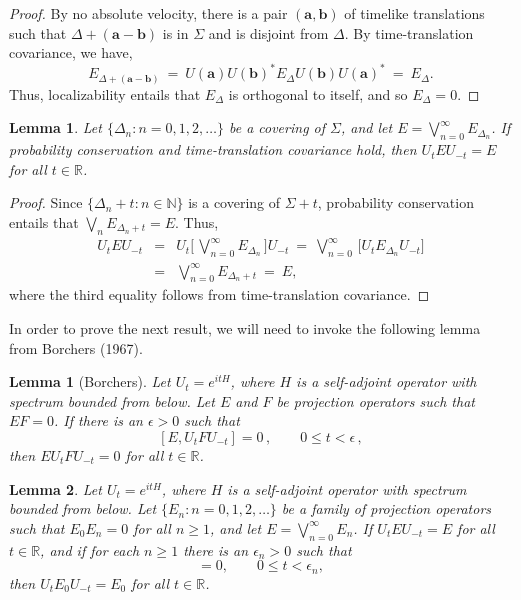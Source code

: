 \documentclass[12pt]{article}
\newtheorem*{lemma*}{Lemma}
\newtheorem{lemma}{Lemma}
\theoremstyle{remark}
\begin{document}
\begin{appendix}
\begin{proof}  By no absolute velocity, there is a pair $(\mathbf{a},\mathbf{b})$
  of timelike translations such that $\Delta +(\mathbf{a}-\mathbf{b})$
  is in $\Sigma$ and is disjoint from $\Delta$.  By time-translation
  covariance, we have,
  \begin{equation} E_{\Delta
      +(\mathbf{a}-\mathbf{b})}\:=\:U(\mathbf{a})U(\mathbf{b})^{*}
    E_{\Delta}U(\mathbf{b})U(\mathbf{a})^{*}\:=\:E_{\Delta}
    .\end{equation} Thus, localizability entails that $E_{\Delta}$ is
  orthogonal to itself, and so $E_{\Delta}=0$.  \end{proof}

\begin{lemma} Let $\{ \Delta _{n}:n=0,1,2,\dots 
  \}$ be a covering of $\Sigma$, and let $E=\bigvee
  _{n=0}^{\infty}E_{\Delta _{n}}$.  If probability conservation and
  time-translation covariance hold, then $U_{t}EU_{-t}=E$ for all
  $t\in \mathbb{R}$.
  \label{commute} \end{lemma}

\begin{proof}  Since $\{ \Delta _{n}+t:n\in \mathbb{N} \}$ is a covering of $\Sigma +{t}$,
  probability conservation entails that $\bigvee _{n}E_{\Delta
    _{n}+t}=E$.  Thus,
\begin{eqnarray}
U_{t}EU_{-t} &=& U_{t}\biggl[ \,\bigvee _{n=0}^{\infty} 
E_{\Delta _{n}} \,\biggr] U_{-t} \:=\: 
\bigvee _{n=0}^{\infty}\,\biggl[ U_{t}E_{\Delta
    _{n}}U_{-t} \biggr] \\
&=& \bigvee _{n=0}^{\infty}E_{\Delta _{n}+t} \: =\:
    E, \end{eqnarray} where the third equality follows from
    time-translation covariance.  \end{proof}

In order to prove the next result, we will need to invoke the
following lemma from Borchers (1967).
\begin{lemma*}[Borchers] Let $U_{t}=e^{itH}$, where $H$ is a self-adjoint
  operator with spectrum bounded from below.  Let $E$ and $F$ be
  projection operators such that $EF=0$.  If there is an $\epsilon >0$
  such that \[ [E,U_{t}FU_{-t}]=0 \,, \qquad 0\leq t<\epsilon \,,\]
  then $EU_{t}FU_{-t}=0$ for all $t\in \mathbb{R}$.
\end{lemma*}

\begin{lemma} Let $U_{t}=e^{itH}$,
  where $H$ is a self-adjoint operator with spectrum bounded from
  below.  Let $\{ E_{n}:n=0,1,2,\dots \}$ be a family of projection
  operators such that $E_{0}E_{n}=0$ for all $n\geq 1$, and let
  $E=\bigvee _{n=0}^{\infty}E_{n}$.  If $U_{t}EU_{-t}=E$ for all $t\in
  \mathbb{R}$, and if for each $n\geq 1$ there is an $\epsilon _{n}>0$
  such that
\begin{equation} [E_{0},U_{t}E_{n}U_{-t}]=0 , \qquad 
0\leq t<\epsilon _{n} , \label{wiggle} \end{equation} then $U_{t}E_{0}U_{-t}=E_{0}$ for all
$t\in \mathbb{R}$.
\label{root} \end{lemma}


\end{appendix}
\end{document}
